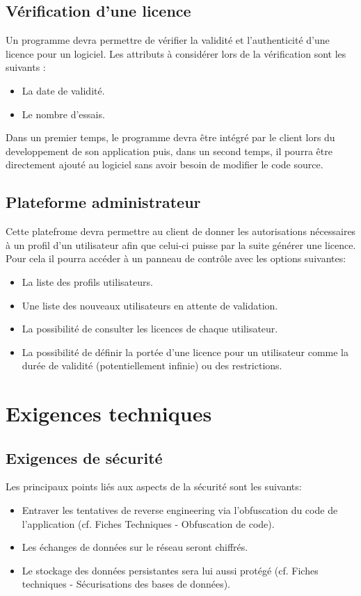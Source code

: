 \section{Vérification d'une licence}
Un programme devra permettre de vérifier la validité et l'authenticité d'une licence pour un logiciel. Les attributs à considérer lors de la vérification sont les suivants :
\begin{itemize}
    \item La date de validité.
    \item Le nombre d'essais.
\end{itemize}

Dans un premier temps, le programme devra être intégré par le client lors du developpement de son application puis, dans un second temps, il pourra être directement ajouté au logiciel sans avoir besoin de modifier le code source.

\section{Plateforme administrateur}
Cette platefrome devra permettre au client de donner les autorisations nécessaires à un profil d'un utilisateur afin que celui-ci puisse par la suite générer une licence.
Pour cela il pourra accéder à un panneau de contrôle avec les options suivantes:

\begin{itemize}
	\item La liste des profils utilisateurs.
	\item Une liste des nouveaux utilisateurs en attente de validation.
	\item La possibilité de consulter les licences de chaque utilisateur.
	\item La possibilité de définir la portée d'une licence pour un utilisateur comme la durée de validité (potentiellement infinie) ou des restrictions.
\end{itemize}
\newpage

\chapter{Exigences techniques}

\section{Exigences de sécurité}
Les principaux points liés aux aspects de la sécurité sont les suivants:
\begin{itemize}
	\item Entraver les tentatives de reverse engineering via l'obfuscation du code de l'application (cf. Fiches Techniques - Obfuscation de code).
	\item Les échanges de données sur le réseau seront chiffrés.
	\item Le stockage des données persistantes sera lui aussi protégé (cf. Fiches techniques - Sécurisations des bases de données).
\end{itemize}

